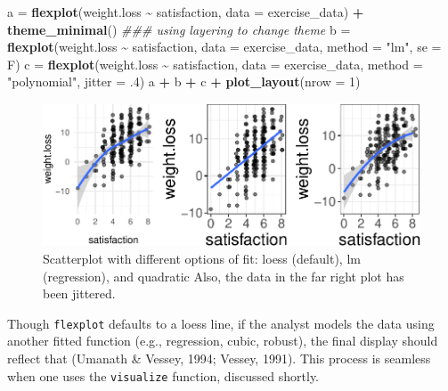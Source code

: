 \documentclass[
  man]{apa6}
\newenvironment{Shaded}{\begin{snugshade}}{\end{snugshade}}
\newcommand{\CommentTok}[1]{\textcolor[rgb]{0.56,0.35,0.01}{\textit{#1}}}
\newcommand{\DataTypeTok}[1]{\textcolor[rgb]{0.13,0.29,0.53}{#1}}
\newcommand{\DecValTok}[1]{\textcolor[rgb]{0.00,0.00,0.81}{#1}}
\newcommand{\FloatTok}[1]{\textcolor[rgb]{0.00,0.00,0.81}{#1}}
\newcommand{\KeywordTok}[1]{\textcolor[rgb]{0.13,0.29,0.53}{\textbf{#1}}}
\newcommand{\NormalTok}[1]{#1}
\newcommand{\OperatorTok}[1]{\textcolor[rgb]{0.81,0.36,0.00}{\textbf{#1}}}
\newcommand{\StringTok}[1]{\textcolor[rgb]{0.31,0.60,0.02}{#1}}
\begin{document}
\begin{Shaded}
\begin{Highlighting}[]
\NormalTok{a =}\StringTok{ }\KeywordTok{flexplot}\NormalTok{(weight.loss }\OperatorTok{\textasciitilde{}}\StringTok{ }\NormalTok{satisfaction, }\DataTypeTok{data =}\NormalTok{ exercise\_data) }\OperatorTok{+}\StringTok{ }
\StringTok{  }\KeywordTok{theme\_minimal}\NormalTok{() }\CommentTok{\#\#\# using layering to change theme}
\NormalTok{b =}\StringTok{ }\KeywordTok{flexplot}\NormalTok{(weight.loss }\OperatorTok{\textasciitilde{}}\StringTok{ }\NormalTok{satisfaction, }\DataTypeTok{data =}\NormalTok{ exercise\_data, }
             \DataTypeTok{method =} \StringTok{"lm"}\NormalTok{, }\DataTypeTok{se =}\NormalTok{ F)}
\NormalTok{c =}\StringTok{ }\KeywordTok{flexplot}\NormalTok{(weight.loss }\OperatorTok{\textasciitilde{}}\StringTok{ }\NormalTok{satisfaction, }\DataTypeTok{data =}\NormalTok{ exercise\_data, }
             \DataTypeTok{method =} \StringTok{"polynomial"}\NormalTok{, }\DataTypeTok{jitter =} \FloatTok{.4}\NormalTok{)}
\NormalTok{a }\OperatorTok{+}\StringTok{ }\NormalTok{b }\OperatorTok{+}\StringTok{ }\NormalTok{c }\OperatorTok{+}\StringTok{ }\KeywordTok{plot\_layout}\NormalTok{(}\DataTypeTok{nrow =} \DecValTok{1}\NormalTok{)}
\end{Highlighting}
\end{Shaded}

\begin{figure}

{\centering \includegraphics{flexplot_psychmeth_files/figure-latex/scatter-1} 

}

\caption{Scatterplot with different options of fit: loess (default), lm (regression), and quadratic Also, the data in the far right plot has been jittered. }\label{fig:scatter}
\end{figure}

\normalsize

Though \texttt{flexplot} defaults to a loess line, if the analyst models the data using another fitted function (e.g., regression, cubic, robust), the final display should reflect that (Umanath \& Vessey, 1994; Vessey, 1991). This process is seamless when one uses the \texttt{visualize} function, discussed shortly.
\end{document}
